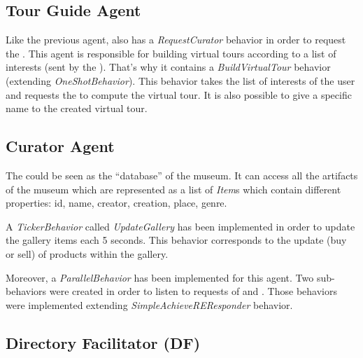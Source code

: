 \documentclass[a4paper,11pt]{article}
\begin{document}
  \subsection{Tour Guide Agent}
  
  
  Like the previous agent, \to{} also has a \textit{RequestCurator} behavior in order to request the \cu{}. This agent is responsible for building virtual tours 
  according to a list of interests (sent by the \pa{}). That's why it contains a \textit{BuildVirtualTour} behavior (extending \textit{OneShotBehavior}). 
  This behavior takes the list of interests of the user and requests the \cu{} to compute the virtual tour. It is also possible to give a 
  specific name to the created virtual tour.
  
  \subsection{Curator Agent}
  
  The \cu{} could be seen as the ``database'' of the museum. It can access all the artifacts of the museum which are represented as a list 
  of \textit{Item}s which contain different properties: id, name, creator, creation, place, genre.
  
  A \textit{TickerBehavior} called \textit{UpdateGallery} has been implemented in order to update the gallery items each 5 seconds. This 
  behavior corresponds to the update (buy or sell) of products within the gallery.
  
  Moreover, a \textit{ParallelBehavior} has been implemented for this agent. Two sub-behaviors were created in order to 
  listen to requests of \to{} and \pa{}. Those behaviors were implemented extending \textit{SimpleAchieveREResponder} behavior.



  
  \subsection{Directory Facilitator (DF)}
\end{document}
